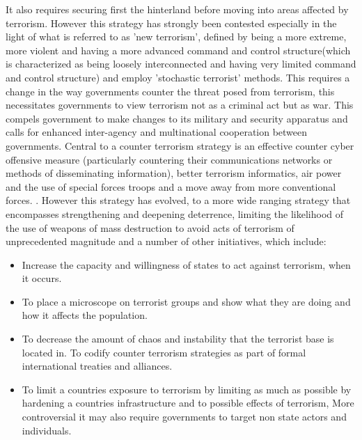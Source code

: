 It also requires securing first the hinterland before moving into areas affected by terrorism. However this strategy has strongly been contested especially in the light of what is referred to as 'new terrorism', defined by being a more extreme, more violent and having a more advanced command and control structure(which is characterized as being loosely interconnected and having very limited command and control structure) and employ 'stochastic terrorist' methods. This requires a change in the way governments counter the threat posed from terrorism, this necessitates governments to view terrorism not as a criminal act but as war. This compels government to make changes to its military and security apparatus and calls for enhanced inter-agency and multinational cooperation between governments. Central to a counter terrorism strategy is an effective counter cyber offensive measure (particularly countering their communications networks or methods of disseminating information), better terrorism informatics, air power and the use of special forces troops and a move away from more conventional forces. \citep{lesser1999countering}. However this strategy has evolved, \citep{lesser1999countering} to a more wide ranging strategy that encompasses strengthening and deepening deterrence, limiting the likelihood of the use of weapons of mass destruction to avoid acts of terrorism of unprecedented magnitude and a number of other initiatives, which include: 
\begin{itemize}
\item Increase the capacity and willingness of states to act against terrorism, when it occurs. 
\item To place a microscope on terrorist groups and show what they are doing and how it affects the population. 
\item To decrease the amount of chaos and instability that the terrorist base is located in. To codify counter terrorism strategies as part of formal international treaties and alliances. 
\item To limit a countries exposure to terrorism by limiting as much as possible by hardening a countries infrastructure and to possible effects of terrorism, More controversial it may also require governments to target non state actors and individuals.
\end{itemize}

